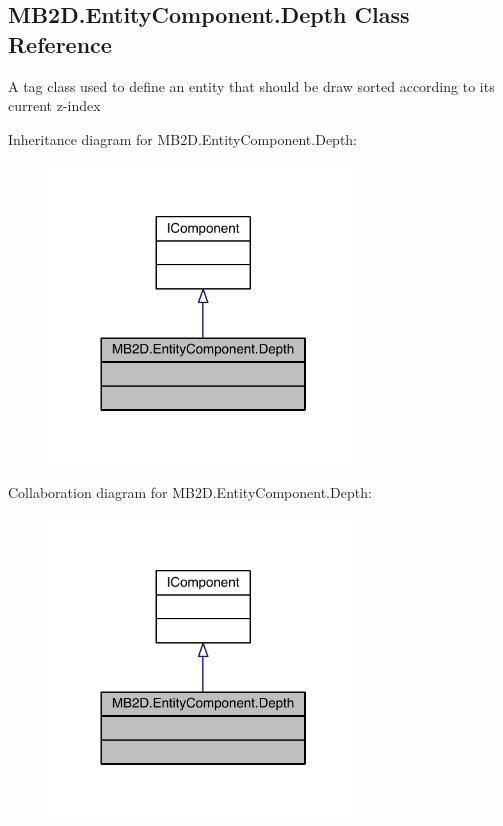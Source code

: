 \hypertarget{class_m_b2_d_1_1_entity_component_1_1_depth}{}\subsection{M\+B2\+D.\+Entity\+Component.\+Depth Class Reference}
\label{class_m_b2_d_1_1_entity_component_1_1_depth}


A tag class used to define an entity that should be draw sorted according to its current z-\/index  




Inheritance diagram for M\+B2\+D.\+Entity\+Component.\+Depth\+:
\nopagebreak
\begin{figure}[H]
\begin{center}
\leavevmode
\includegraphics[width=233pt]{class_m_b2_d_1_1_entity_component_1_1_depth__inherit__graph}
\end{center}
\end{figure}


Collaboration diagram for M\+B2\+D.\+Entity\+Component.\+Depth\+:
\nopagebreak
\begin{figure}[H]
\begin{center}
\leavevmode
\includegraphics[width=233pt]{class_m_b2_d_1_1_entity_component_1_1_depth__coll__graph}
\end{center}
\end{figure}


